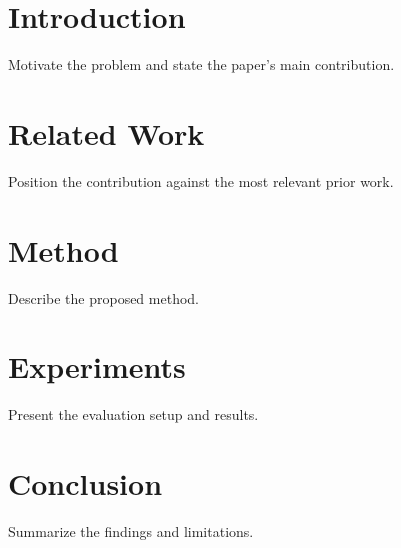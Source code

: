\documentclass{article}
\begin{document}

\printAffiliationsAndNotice{}

\begin{abstract}
Briefly summarize the problem, method, and main result.
\end{abstract}

\section{Introduction}
Motivate the problem and state the paper's main contribution.

\section{Related Work}
Position the contribution against the most relevant prior work.

\section{Method}
Describe the proposed method.

\section{Experiments}
Present the evaluation setup and results.

\section{Conclusion}
Summarize the findings and limitations.

\nocite{knuth1984} %


\end{document}
